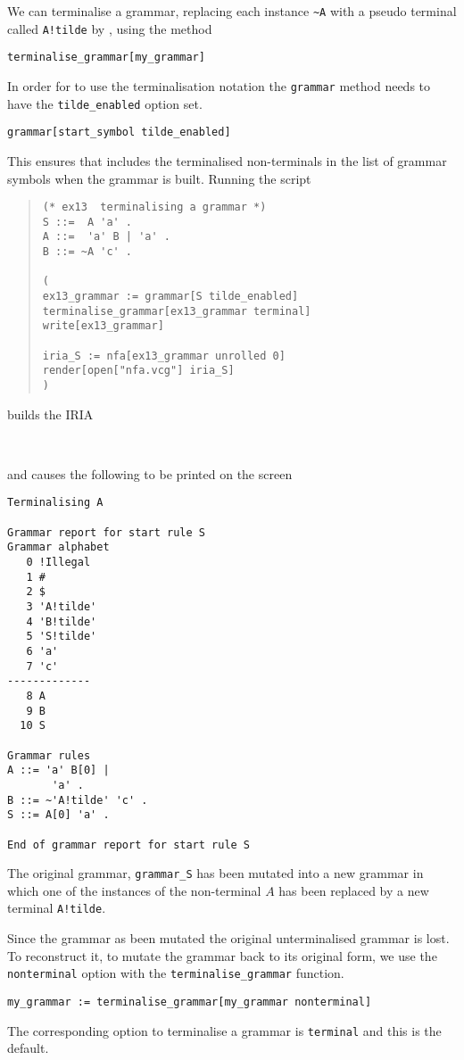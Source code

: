 We can terminalise a grammar, replacing each instance \verb+~A+ with a
pseudo terminal called \verb+A!tilde+ by \gtbs, using the method
\begin{center}\label{p_tld}
\verb+terminalise_grammar[my_grammar]+
\end{center}
In order
for \gtb to use the terminalisation notation the \verb+grammar+ method
needs to have the \verb+tilde_enabled+ option set. 
\begin{center}
\verb+grammar[start_symbol tilde_enabled]+
\end{center}
This ensures that
\gtb includes the terminalised non-terminals in the list of grammar
symbols when the grammar is built.
Running the script
\begin{quote}
\begin{verbatim}
(* ex13  terminalising a grammar *)
S ::=  A 'a' .
A ::=  'a' B | 'a' .
B ::= ~A 'c' .

(
ex13_grammar := grammar[S tilde_enabled]
terminalise_grammar[ex13_grammar terminal]
write[ex13_grammar]

iria_S := nfa[ex13_grammar unrolled 0]
render[open["nfa.vcg"] iria_S]
)
\end{verbatim}
\end{quote}
builds the IRIA
\begin{center}
\\[2mm]
\end{center}
and causes the following to be printed on the screen
{\small
\begin{verbatim}
Terminalising A

Grammar report for start rule S
Grammar alphabet
   0 !Illegal
   1 #
   2 $
   3 'A!tilde'
   4 'B!tilde'
   5 'S!tilde'
   6 'a'
   7 'c'
-------------
   8 A
   9 B
  10 S

Grammar rules
A ::= 'a' B[0] |
       'a' .
B ::= ~'A!tilde' 'c' .
S ::= A[0] 'a' .

End of grammar report for start rule S
\end{verbatim}
}%

The original grammar, \verb+grammar_S+ has been mutated into a new
grammar in which one of the instances of the non-terminal $A$ has been
replaced by a new terminal \verb+A!tilde+.

Since the grammar as been mutated the original unterminalised grammar is
lost. To reconstruct it, to mutate the grammar back to its original
form, we use the \verb+nonterminal+ option with the \verb+terminalise_grammar+
function.
\begin{center}
\verb+my_grammar := terminalise_grammar[my_grammar nonterminal]+
\end{center}
The corresponding option to terminalise a grammar is \verb+terminal+ and 
this is the default.


